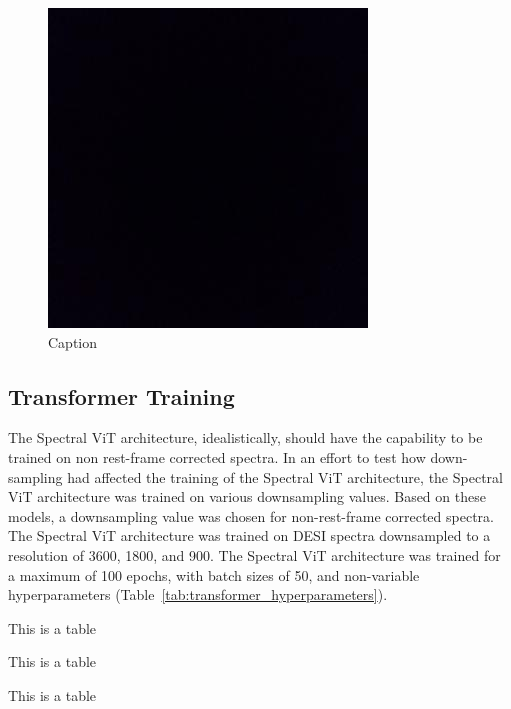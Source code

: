 \begin{figure}
    \centering
    \includegraphics[width = .4\linewidth]{figures/blackbox.jpeg}
    \caption{Caption}
    \label{fig:cnn_training}
\end{figure}

\subsection{Transformer Training}
\label{sec:transformer_training}
The Spectral ViT architecture, idealistically, should have the capability to be trained 
on non rest-frame corrected spectra. In an effort to test how down-sampling had 
affected the training of the Spectral ViT architecture, the Spectral ViT architecture
was trained on various downsampling values. Based on these models, a downsampling 
value was chosen for non-rest-frame corrected spectra. The Spectral ViT architecture 
was trained on DESI spectra downsampled to a resolution of 3600, 1800, and 900. 
The Spectral ViT architecture was trained for a maximum of 100 epochs, with 
batch sizes of 50, and non-variable hyperparameters (Table~\ref{tab:transformer_hyperparameters}).



\begin{table}[!ht]
\small
\centering
\sffamily

\caption{This is a table}
\label{tab:cnn_architecture}
\vspace{-5mm}
\end{table}

\begin{table}[!ht]
\small
\centering
\sffamily

\caption{This is a table}
\label{tab:cnn_hyperparameters}
\vspace{-5mm}
\end{table}

\begin{table}[!ht]
\small
\centering
\sffamily

\caption{This is a table}
\label{tab:transformer_hyperparameters}
\vspace{-5mm}
\end{table}



